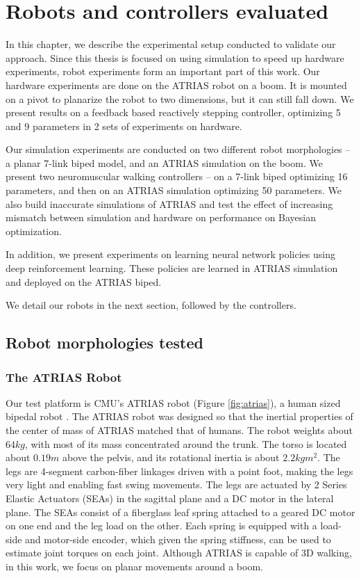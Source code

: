 \chapter{Robots and controllers evaluated}
\label{chap:robots}
In this chapter, we describe the experimental setup conducted to validate our approach. Since this thesis is focused on using simulation to speed up hardware experiments, robot experiments form an important part of this work. Our hardware experiments are done on the ATRIAS robot on a boom. It is mounted on a pivot to planarize the robot to two dimensions, but it can still fall down. We present results on a feedback based reactively stepping controller, optimizing 5 and 9 parameters in 2 sets of experiments on hardware. 

Our simulation experiments are conducted on two different robot morphologies -- a planar 7-link biped model, and an ATRIAS simulation on the boom. We present two neuromuscular walking controllers -- on a 7-link biped optimizing 16 parameters, and then on an ATRIAS simulation optimizing 50 parameters. We also build inaccurate simulations of ATRIAS and test the effect of increasing mismatch between simulation and hardware on performance on Bayesian optimization.

In addition, we present experiments on learning neural network policies using deep reinforcement learning. These policies are learned in ATRIAS simulation and deployed on the ATRIAS biped.

We detail our robots in the next section, followed by the controllers. 

\section{Robot morphologies tested}

\subsection{The ATRIAS Robot}
\label{sec:atrias}
Our test platform is CMU's ATRIAS robot (Figure \ref{fig:atrias}), a human sized bipedal robot \citep{hubicki2016atrias}. The ATRIAS robot was designed so that the inertial properties of the center of mass of ATRIAS matched that of humans. The robot weights about $64kg$, with most of its mass concentrated around the trunk. The torso is located about $0.19m$ above the pelvis, and its rotational inertia is about $2.2 kgm^2$. The legs are 4-segment carbon-fiber linkages driven with a point foot, making the legs very light and enabling fast swing movements. The legs are actuated by 2 Series Elastic Actuators (SEAs) in the sagittal plane and a DC motor in the lateral plane. The SEAs consist of a fiberglass leaf spring attached to a geared DC motor on one end and the leg load on the other. Each spring is equipped with a load-side and motor-side encoder, which given the spring stiffness, can be used to estimate joint torques on each joint. 
Although ATRIAS is capable of 3D walking, in this work, we focus on planar movements around a boom.

